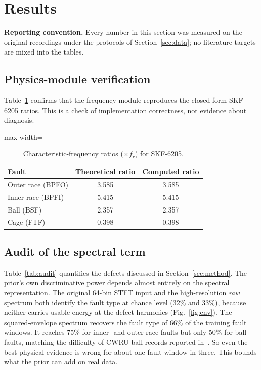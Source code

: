 \documentclass[conference]{IEEEtran}
\begin{document}
\section{Results}
\label{sec:results}
\textbf{Reporting convention.} Every number in this section was measured on the
original recordings under the protocols of Section~\ref{sec:data}; no
literature targets are mixed into the tables.

\subsection{Physics-module verification}
Table~\ref{tab:freq} confirms that the frequency module reproduces the
closed-form SKF-6205 ratios. This is a check of implementation correctness, not
evidence about diagnosis.

\begin{table}[t]
\caption{Characteristic-frequency ratios ($\times f_r$) for SKF-6205.}
\label{tab:freq}
\centering
\footnotesize
\begin{adjustbox}{max width=\columnwidth}
\begin{tabular}{lcc}
\toprule
Fault & Theoretical ratio & Computed ratio \\
\midrule
Outer race (BPFO) & 3.585 & 3.585 \\
Inner race (BPFI) & 5.415 & 5.415 \\
Ball (BSF)        & 2.357 & 2.357 \\
Cage (FTF)        & 0.398 & 0.398 \\
\bottomrule
\end{tabular}
\end{adjustbox}
\end{table}

\subsection{Audit of the spectral term}
Table~\ref{tab:audit} quantifies the defects discussed in Section~\ref{sec:method}.
The prior's own discriminative power depends almost entirely on the spectral
representation. The original 64-bin STFT input and the high-resolution
\emph{raw} spectrum both identify the fault type at chance level (32\% and
33\%), because neither carries usable energy at the defect harmonics
(Fig.~\ref{fig:env}). The squared-envelope spectrum recovers the fault type of
66\% of the training fault windows. It reaches 75\% for inner- and outer-race
faults but only 50\% for ball faults, matching the difficulty of CWRU ball
records reported in~\cite{smith2015}. So even the best physical evidence is
wrong for about one fault window in three. This bounds what the prior can add
on real data.
\end{document}

